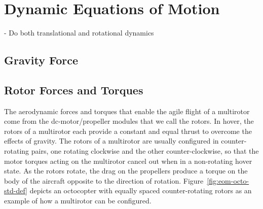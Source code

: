 {


\section{Dynamic Equations of Motion}

- Do both translational and rotational dynamics

\subsection{Gravity Force}

}


\subsection{Rotor Forces and Torques}
The aerodynamic forces and torques that enable the agile flight of a multirotor come from the dc-motor/propeller modules that we call the rotors. In hover, the rotors of a multirotor each provide a constant and equal thrust to overcome the effects of gravity. The rotors of a multirotor are usually configured in counter-rotating pairs, one rotating clockwise and the other counter-clockwise, so that the motor torques acting on the multirotor cancel out  when in a non-rotating hover state. As the rotors rotate, the drag on the propellers produce a torque on the body of the aircraft opposite to the direction of rotation. Figure~\ref{fig:eom-octo-std-def} depicts an octocopter with equally spaced counter-rotating rotors as an example of how a multirotor can be configured.

